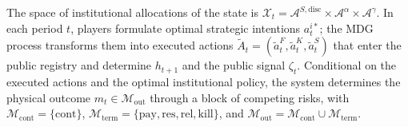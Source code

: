 \documentclass[ecta,nameyear,draft]{econsocart}
\theoremstyle{plain}
\theoremstyle{definition}
\newcommand{\1}{\mathbf{1}}
\begin{document}
The space of institutional allocations of the state is $\mathcal{X}_t=\mathcal{A}^{S,\mathrm{disc}}\times\mathcal{A}^{\alpha}\times\mathcal{A}^{\gamma}$. In each period $t$, players formulate optimal strategic intentions $a_t^{i\ast}$; the MDG process transforms them into executed actions $\tilde{A}_t=(\tilde{a}_t^F,\tilde{a}_t^K,\tilde{a}_t^S)$ that enter the public registry and determine $h_{t+1}$ and the public signal $\zeta_t$. Conditional on the executed actions and the optimal institutional policy, the system determines the physical outcome $m_t\in\mathcal{M}_{\mathrm{out}}$ through a block of competing risks, with $\mathcal{M}_{\mathrm{cont}}=\{\mathrm{cont}\}$, $\mathcal{M}_{\mathrm{term}}=\{\mathrm{pay},\mathrm{res},\mathrm{rel},\mathrm{kill}\}$, and $\mathcal{M}_{\mathrm{out}}=\mathcal{M}_{\mathrm{cont}}\cup\mathcal{M}_{\mathrm{term}}$.
\end{document}
